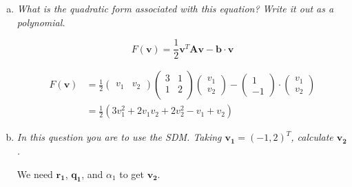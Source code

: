 \documentclass{article}
\let\vec\mathbf
\begin{document}
\begin{enumerate}[(a)]
  \item \textit{What is the quadratic form associated with this equation? Write it out as a polynomial.}

    $$F(\vec{v}) = \frac{1}{2}\vec{v}^T\vec{A}\vec{v}-\vec{b} \cdot \vec{v}$$

    \begin{align*}
      F(\vec{v}) &= \frac{1}{2}
      \begin{pmatrix}
        v_1 & v_2
      \end{pmatrix}
      \begin{pmatrix}
        3 & 1 \\ 1 & 2 \\
      \end{pmatrix}
      \begin{pmatrix}
        v_1 \\ v_2
      \end{pmatrix}
      -
      \begin{pmatrix}
        1 \\ -1
      \end{pmatrix}
      \cdot
      \begin{pmatrix}
        v_1 \\ v_2
      \end{pmatrix} \\
      &= \frac{1}{2}(3v_1^2 + 2v_1v_2 + 2v_2^2 - v_1 + v_2)
    \end{align*}

  \item \textit{In this question you are to use the SDM. Taking $\vec{v_1} = (-1,2)^T$, calculate $\vec{v_2}$.}

    We need $\vec{r_1}$, $\vec{q_1}$, and $\alpha_1$ to get $\vec{v_2}$.


\end{enumerate}
\end{document}
